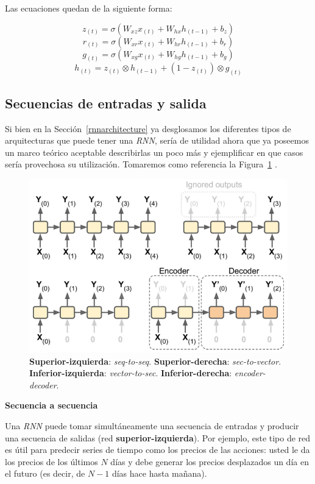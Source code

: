 \documentclass[a4paper,12pt]{article}
\begin{document}
Las ecuaciones quedan de la siguiente forma:

$$z_{(t)}=\sigma(W_{xz}x_{(t)} + W_{hx}h_{(t-1)} + b_z)$$
$$r_{(t)}=\sigma(W_{xr}x_{(t)} + W_{hr}h_{(t-1)} + b_r)$$
$$g_{(t)}=\sigma(W_{xg}x_{(t)} + W_{hg}h_{(t-1)} + b_g)$$
$$h_{(t)}=z_{(t)} \otimes h_{(t-1)} + (1-z_{(t)}) \otimes g_{(t)}$$

\subsection{Secuencias de entradas y salida}

Si bien en la Sección~\ref{rnnarchitecture} ya desglosamos los diferentes tipos de arquitecturas que puede tener una \textit{RNN}, sería de utilidad ahora que ya poseemos un marco teórico aceptable describirlas un poco más y ejemplificar en que casos sería provechosa su utilización. Tomaremos como referencia la Figura~\ref{fig:rnnnets} \citep{geron}.

\begin{figure}[H]
	\begin{center}				
	\includegraphics[width=1\textwidth]{tesis_42.png}
  	\caption{\textbf{Superior-izquierda}: \textit{seq-to-seq}. \textbf{Superior-derecha}: \textit{sec-to-vector}. \textbf{Inferior-izquierda}: \textit{vector-to-sec}. \textbf{Inferior-derecha}: \textit{encoder-decoder}.}
  	\label{fig:rnnnets}
  	\end{center}
\end{figure}

\textbf{Secuencia a secuencia}

Una \textit{RNN} puede tomar simultáneamente una secuencia de entradas y producir una secuencia de salidas (red \textbf{superior-izquierda}). Por ejemplo, este tipo de red es útil para predecir series de tiempo como los precios de las acciones: usted le da los precios de los últimos $N$ días y debe generar los precios desplazados un día en el futuro (es decir, de $N - 1$ días hace hasta mañana).
\end{document}
